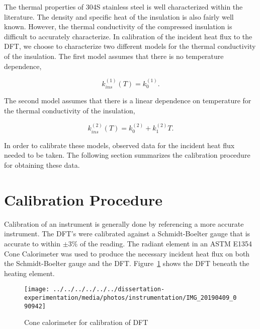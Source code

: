 \documentclass[article]{proc}
\begin{document}
    The thermal properties of 304S stainless steel is well characterized within the literature. The density and specific heat of the insulation is also fairly well known. However, the thermal conductivity of the compressed insulation is difficult to accurately characterize. In calibration of the incident heat flux to the DFT, we choose to characterize two different models for the thermal conductivity of the insulation. The first model assumes that there is no temperature dependence,

    \begin{equation}\label{eq:k_ins_1}
        k_{ins}^{(1)}(T) = k_0^{(1)}.
    \end{equation}

    \noindent The second model assumes that there is a linear dependence on temperature for the thermal conductivity of the insulation,

    \begin{equation}\label{eq:k_ins_2}
        k_{ins}^{(2)}(T) = k^{(2)}_0 + k^{(2)}_1 T.
    \end{equation}

    In order to calibrate these models, observed data for the incident heat flux needed to be taken. The following section summarizes the calibration procedure for obtaining these data.
    
\section{Calibration Procedure}

    Calibration of an instrument is generally done by referencing a more accurate instrument. The DFT's were calibrated against a Schmidt-Boelter gauge that is accurate to within $\pm 3\%$ of the reading. The radiant element in an ASTM E1354 Cone Calorimeter was used to produce the necessary incident heat flux on both the Schmidt-Boelter gauge and the DFT. Figure~\ref{fig:cone_dft} shows the DFT beneath the heating element. 

    \begin{figure}[h!]
        \centering
        \texttt{[image: ../../../../../../dissertation-experimentation/media/photos/instrumentation/IMG\_20190409\_090942]}
        \caption{Cone calorimeter for calibration of DFT}
        \label{fig:cone_dft}
    \end{figure}
\end{document}
